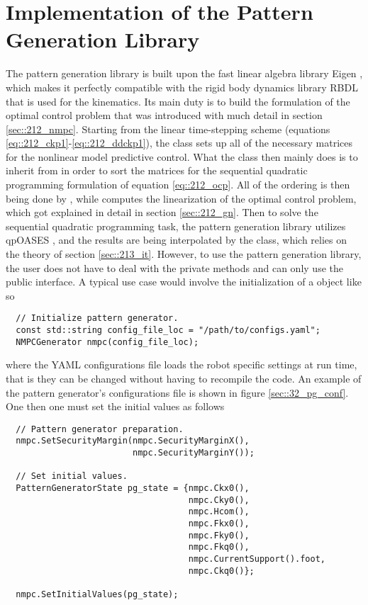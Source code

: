 \FloatBarrier
\section{Implementation of the Pattern Generation Library}
\label{sec::32_pg}
The pattern generation library is built upon the fast linear algebra library Eigen \cite{eigenweb}, which makes it perfectly compatible with the rigid body dynamics library RBDL \cite{felis2017rbdl} that is used for the kinematics. Its main duty is to build the formulation of the optimal control problem that was introduced with much detail in section \ref{sec::212_nmpc}. Starting from the linear time-stepping scheme (equations \ref{eq::212_ckp1}-\ref{eq::212_ddckp1}), the  class sets up all of the necessary matrices for the nonlinear model predictive control. What the  class then mainly does is to inherit from  in order to sort the matrices for the sequential quadratic programming formulation of equation \ref{eq::212_ocp}. All of the ordering is then being done by , while  computes the linearization of the optimal control problem, which got explained in detail in section \ref{sec::212_gn}. Then to solve the sequential quadratic programming task, the pattern generation library utilizes qpOASES \cite{ferreau2014qpoases}, and the results are being interpolated by the  class, which relies on the theory of section \ref{sec::213_it}. However, to use the pattern generation library, the user does not have to deal with the private methods and can only use the public interface. A typical use case would involve the initialization of a  object like so
\begin{verbatim}
  // Initialize pattern generator.
  const std::string config_file_loc = "/path/to/configs.yaml";
  NMPCGenerator nmpc(config_file_loc);
\end{verbatim} 
where the YAML configurations file loads the robot specific settings at run time, that is they can be changed without having to recompile the code. An example of the pattern generator's configurations file is shown in figure \ref{sec::32_pg_conf}. One then one must set the initial values as follows
\begin{verbatim}
  // Pattern generator preparation.
  nmpc.SetSecurityMargin(nmpc.SecurityMarginX(), 
                         nmpc.SecurityMarginY());
	
  // Set initial values.
  PatternGeneratorState pg_state = {nmpc.Ckx0(),
                                    nmpc.Cky0(),
                                    nmpc.Hcom(),
                                    nmpc.Fkx0(),
                                    nmpc.Fky0(),
                                    nmpc.Fkq0(),
                                    nmpc.CurrentSupport().foot,
                                    nmpc.Ckq0()};

  nmpc.SetInitialValues(pg_state);
\end{verbatim}
